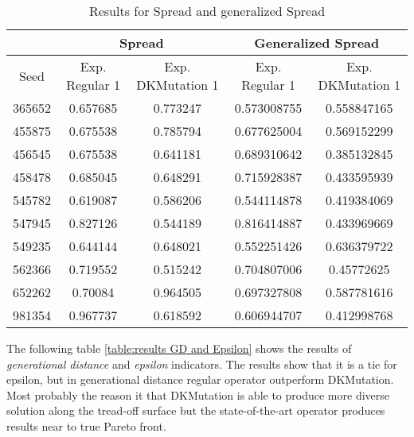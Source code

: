 \documentclass{article}
\begin{document}
\begin{table}[h]

\caption {Results for Spread and generalized Spread}
\label{table: results Spread and generalized Spread}
\begin{tabular}{c|cc|cc}\hline
\multicolumn{1}{l}{} & \multicolumn{2}{c}{Spread}         & \multicolumn{2}{c}{Generalized Spread} \\ \hline
Seed                 & Exp. Regular 1 & Exp. DKMutation 1 & Exp. Regular 1   & Exp. DKMutation 1   \\ \hline
365652               & \cellcolor[gray]{0.7}0.657685       & 0.773247          & 0.573008755      & \cellcolor[gray]{0.7}0.558847165         \\
455875               & \cellcolor[gray]{0.7}0.675538       & 0.785794          & 0.677625004      & \cellcolor[gray]{0.7}0.569152299         \\
456545               & 0.675538       & \cellcolor[gray]{0.7}0.641181          & 0.689310642      & \cellcolor[gray]{0.7}0.385132845         \\
458478               & 0.685045       & \cellcolor[gray]{0.7}0.648291          & 0.715928387      &\cellcolor[gray]{0.7} 0.433595939         \\
545782               & 0.619087       & \cellcolor[gray]{0.7}0.586206          & 0.544114878      & \cellcolor[gray]{0.7}0.419384069         \\
547945               & 0.827126       & \cellcolor[gray]{0.7}0.544189          & 0.816414887      & \cellcolor[gray]{0.7}0.433969669         \\
549235               & \cellcolor[gray]{0.7}0.644144       & 0.648021          & \cellcolor[gray]{0.7}0.552251426      & 0.636379722         \\
562366               & 0.719552       & \cellcolor[gray]{0.7}0.515242          & 0.704807006      &\cellcolor[gray]{0.7} 0.45772625          \\
652262               &\cellcolor[gray]{0.7} 0.70084        & 0.964505          & 0.697327808      & \cellcolor[gray]{0.7}0.587781616         \\
981354               & 0.967737       & \cellcolor[gray]{0.7}0.618592          & 0.606944707      & \cellcolor[gray]{0.7}0.412998768   \\ \hline     
\end{tabular}
\end{table}

The following table \ref{table:results GD and Epsilon} shows the results of \textit{generational distance} and \textit{epsilon} indicators.
The results show that it is a tie for epsilon, but in generational distance regular operator outperform DKMutation. 
Most probably the reason it that DKMutation is able to produce more diverse solution along the tread-off surface but the state-of-the-art operator produces results near to true Pareto front.
\end{document}
